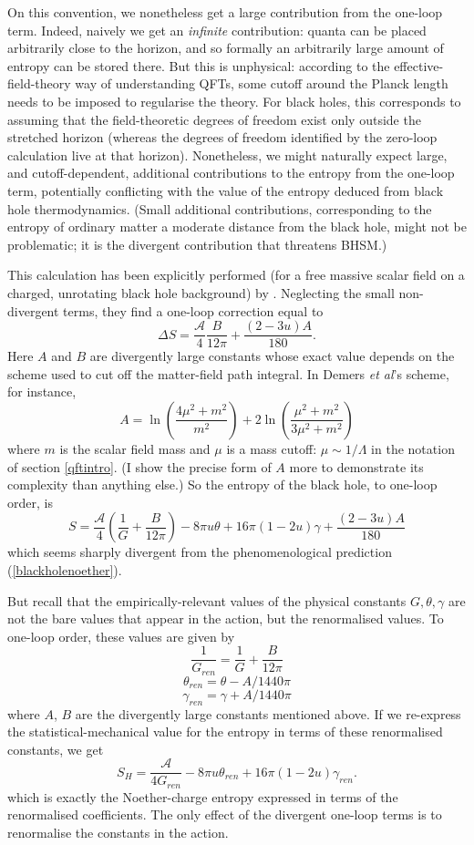 \documentclass{article}
\newcommand{\mc}[1]{\ensuremath{\mathcal{#1}}}
\newcommand{\be}{\begin{equation}}
\newcommand{\ee}{\end{equation}}
\begin{document}
On this convention, we nonetheless get a large contribution from the one-loop term. Indeed, naively we get an \emph{infinite} contribution: quanta can be placed arbitrarily close to the horizon, and so formally an arbitrarily large amount of entropy can be stored there. But this is unphysical: according to the effective-field-theory way of understanding QFTs, some cutoff around the Planck length needs to be imposed to regularise the theory. For black holes, this corresponds to assuming that the field-theoretic degrees of freedom exist only outside the stretched horizon (whereas the degrees of freedom identified by the zero-loop calculation live at that horizon). Nonetheless, we might naturally expect large, and cutoff-dependent, additional contributions to the entropy from the one-loop term, potentially conflicting with the value of the entropy deduced from black hole thermodynamics. (Small additional contributions, corresponding to the entropy of ordinary matter a moderate distance from the black hole, might not be problematic; it is the divergent contribution that threatens BHSM.)

This calculation has been explicitly performed (for a free massive scalar field on a charged, unrotating black hole background) by . Neglecting the small non-divergent terms, they find a one-loop correction equal to
\be
\Delta S=\frac{\mc{A}}{4}\frac{B}{12\pi} + \frac{(2-3u)A}{180}.
\ee
Here $A$ and $B$ are divergently large constants whose exact value depends on the scheme used to cut off the matter-field path integral. In Demers \emph{et al}'s scheme, for instance, 
\be 
A = \ln \left(\frac{4 \mu^2 + m^2}{m^2}\right) + 2 \ln \left(\frac{\mu^2 + m^2}{3\mu^2 + m^2}\right)
\ee
where $m$ is the scalar field mass and $\mu$ is a mass cutoff: $\mu \sim 1/\Lambda$ in the notation of section \ref{qftintro}. (I show the precise form of $A$ more to demonstrate its complexity than anything else.) So the entropy of the black hole, to one-loop order, is
\be
S = \frac{\mc{A}}{4}\left(\frac{1}{G}+\frac{B}{12\pi} \right) - 8\pi u \theta + 16 \pi(1-2u)\gamma  + \frac{(2-3u)A}{180}
\ee
which seems sharply divergent from the phenomenological prediction (\ref{blackholenoether}).

But recall that the empirically-relevant values of the physical constants $G,\theta,\gamma$ are not the bare values that appear in the action, but the renormalised values. To one-loop order, these values are given by
\[
\frac{1}{G_{ren}} = \frac{1}{G}+ \frac{B}{12\pi}
\]
\[
\theta_{ren} = \theta - A/1440\pi \] \be\gamma_{ren} = \gamma + A/1440\pi \ee where $A$, $B$ are the divergently large constants mentioned above. If we re-express the statistical-mechanical value for the entropy in terms of these renormalised constants, we get
\be
S_H = \frac{\mc{A}}{4 G_{ren}} - 8 \pi u \theta_{ren} + 16\pi  (1-2u) \gamma_{ren}.
\ee
which is exactly the Noether-charge entropy expressed in terms of the renormalised coefficients. The only effect of the divergent one-loop terms is to renormalise the constants in the action.
\end{document}
